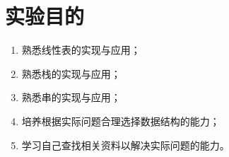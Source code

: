 \section{实验目的}
    \begin{enumerate}
        \item 熟悉线性表的实现与应用；
        \item 熟悉栈的实现与应用；
        \item 熟悉串的实现与应用；
        \item 培养根据实际问题合理选择数据结构的能力；
        \item 学习自己查找相关资料以解决实际问题的能力。
    \end{enumerate}\oint \bigoplus 